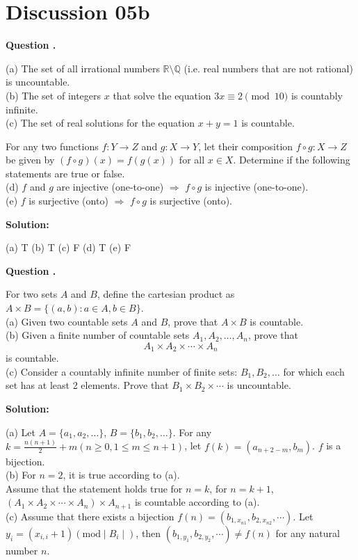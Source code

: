 \documentclass[12pt]{article}
\newcounter{questionnumber}
\newenvironment{question}[1][]{\stepcounter{questionnumber}\par\noindent\textbf{Question \thequestionnumber. #1}\par}{\par}
\newenvironment{solution}{\par\noindent\textbf{Solution:}\par}{\par\vspace{1em}}
\begin{document}
\section{Discussion 05b}
\begin{question}
    \noindent
    (a) The set of all irrational numbers $\mathbb{R} \setminus \mathbb{Q}$ (i.e. real numbers that are not rational) is uncountable.\\
    (b) The set of integers $x$ that solve the equation $3x \equiv 2 \pmod{10}$ is countably infinite.\\
    (c) The set of real solutions for the equation $x + y = 1$ is countable.

    For any two functions $f: Y \rightarrow Z$ and $g: X \rightarrow Y$, let their composition $f \circ g: X \rightarrow Z$ be given by $(f \circ g)(x) = f(g(x))$ for all $x \in X$. Determine if the following statements are true or false.\\
    (d) $f$ and $g$ are injective (one-to-one) $\Longrightarrow$ $f \circ g$ is injective (one-to-one).\\
    (e) $f$ is surjective (onto) $\Longrightarrow$ $f \circ g$ is surjective (onto).
\end{question}
\begin{solution}
    \noindent
    (a) T (b) T (c) F (d) T (e) F
\end{solution}
\begin{question}
    For two sets $A$ and $B$, define the cartesian product as $A \times B = \{(a, b) : a \in A, b \in B\}$.\\
    (a) Given two countable sets $A$ and $B$, prove that $A \times B$ is countable.\\
    (b) Given a finite number of countable sets $A_1, A_2, \ldots, A_n$, prove that
    $$A_1 \times A_2 \times \cdots \times A_n$$
    is countable.\\
    (c) Consider a countably infinite number of finite sets: $B_1, B_2, \ldots$ for which each set has at least 2 elements. Prove that $B_1 \times B_2 \times \cdots$ is uncountable.
\end{question}
\begin{solution}
    \noindent
    (a) Let $A=\{a_1,a_2,\dots\}$, $B=\{b_1,b_2,\dots\}$.
    For any $k=\frac{n\left( n+1 \right)}{2}+m\left( n\geq 0, 1\le m\le n+1 \right) $, let $f\left( k \right) =\left( a_{n+2-m},b_m \right) $.
    $f$ is a bijection.\\
    (b) For $n=2$, it is true according to (a).\\
    Assume that the statement holds true for $n=k$, for $n=k+1$, $\left(A_1 \times A_2 \times \cdots \times A_n\right) \times A_{n+1}$ is countable according to (a).\\
    (c) Assume that there exists a bijection $f\left( n \right) =\left( b_{1,x_{n1}},b_{2,x_{n2}},\cdots \right) $.
    Let $y_i=(x_{i,i}+1)(\mathrm{mod}\mid B_i\mid )$, then $\left( b_{1,y_1},b_{2,y_2},\cdots \right)\neq f(n)$ for any natural number $n$. 
\end{solution}
\end{document}
